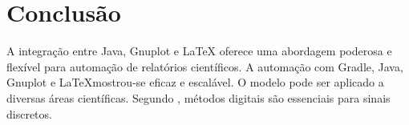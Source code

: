 \pagebreak
\section{Conclusão}
A integração entre Java, Gnuplot e LaTeX oferece uma abordagem poderosa e flexível para automação de relatórios científicos.
A automação com Gradle, Java, Gnuplot e \LaTeX mostrou-se eficaz e escalável. O modelo pode ser aplicado a diversas áreas científicas.
Segundo \cite{oppenheim}, métodos digitais são essenciais para sinais discretos.

